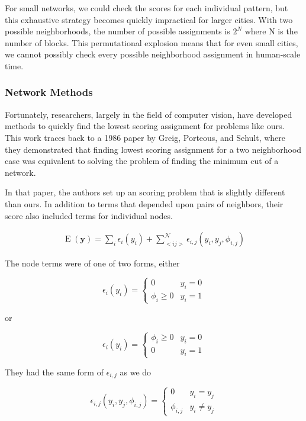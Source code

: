 For small networks, we could check the scores for each individual
pattern, but this exhaustive strategy becomes quickly impractical
for larger cities. With two possible neighborhoods, the number of
possible assignments is $2^N$ where N is the number of blocks. This
permutational explosion means that for even small cities, we cannot
possibly check every possible neighborhood assignment in human-scale
time.

\subsubsection{Network Methods}
Fortunately, researchers, largely in the field of computer vision,
have developed methods to quickly find the lowest scoring assignment
for problems like ours. This work traces back to a 1986 paper by
Greig, Porteous, and Sehult, where they demonstrated that finding
lowest scoring assignment for a two neighborhood case was equivalent
to solving the problem of finding the minimum cut of a
network.\cite{greig_exact_1989}

In that paper, the authors set up an scoring problem that is slightly
different than ours. In addition to terms that depended upon pairs of
neighbors, their score also included terms for individual nodes.

\begin{align}
\operatorname{E}(\mathbf{y}) = \sum_i\epsilon_i(y_i) + \sum_{<i
  j>}^{\mathcal{N}}\epsilon_{i,j}(y_i,y_j,\phi_{i,j})
\end{align}

\noindent
The node terms were of one of two forms, either

\begin{equation}
\epsilon_{i}(y_i) = \begin{cases}
  0 &y_i = 0 \\
  \phi_{i} \geq 0 &y_i = 1
\end{cases}
\end{equation}

\noindent
or 

\begin{equation}
\epsilon_{i}(y_i) = \begin{cases}
  \phi_{i} \geq 0 &y_i = 0 \\
  0 &y_i = 1
\end{cases}
\end{equation}

\noindent
They had the same form of $\epsilon_{i,j}$ as we do

\begin{equation}
\epsilon_{i,j}(y_i,y_j,\phi_{i,j}) = \begin{cases}
  0 &y_i = y_j \\
  \phi_{i,j} &y_i \neq y_j
\end{cases}
\end{equation}

